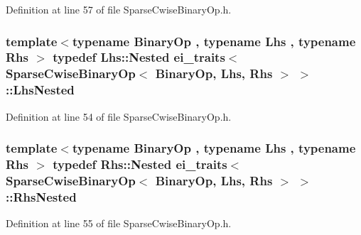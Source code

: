 Definition at line 57 of file Sparse\-Cwise\-Binary\-Op.\-h.

\hypertarget{structei__traits_3_01_sparse_cwise_binary_op_3_01_binary_op_00_01_lhs_00_01_rhs_01_4_01_4_a70fba1f05cd4ca7e69cfbdf550c18981}{
\subsubsection[{Lhs\-Nested}]{\setlength{\rightskip}{0pt plus 5cm}template$<$typename Binary\-Op , typename Lhs , typename Rhs $>$ typedef Lhs\-::\-Nested {\bf ei\-\_\-traits}$<$ {\bf Sparse\-Cwise\-Binary\-Op}$<$ Binary\-Op, Lhs, Rhs $>$ $>$\-::{\bf Lhs\-Nested}}}\label{structei__traits_3_01_sparse_cwise_binary_op_3_01_binary_op_00_01_lhs_00_01_rhs_01_4_01_4_a70fba1f05cd4ca7e69cfbdf550c18981}


Definition at line 54 of file Sparse\-Cwise\-Binary\-Op.\-h.

\hypertarget{structei__traits_3_01_sparse_cwise_binary_op_3_01_binary_op_00_01_lhs_00_01_rhs_01_4_01_4_ac6c5573f5517a8f2225ce9be7d46a3f2}{
\subsubsection[{Rhs\-Nested}]{\setlength{\rightskip}{0pt plus 5cm}template$<$typename Binary\-Op , typename Lhs , typename Rhs $>$ typedef Rhs\-::\-Nested {\bf ei\-\_\-traits}$<$ {\bf Sparse\-Cwise\-Binary\-Op}$<$ Binary\-Op, Lhs, Rhs $>$ $>$\-::{\bf Rhs\-Nested}}}\label{structei__traits_3_01_sparse_cwise_binary_op_3_01_binary_op_00_01_lhs_00_01_rhs_01_4_01_4_ac6c5573f5517a8f2225ce9be7d46a3f2}


Definition at line 55 of file Sparse\-Cwise\-Binary\-Op.\-h.

